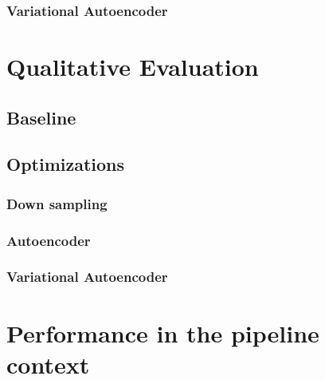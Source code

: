 \subsubsection{Variational Autoencoder}
\section{Qualitative Evaluation}\label{qualitative_eval}
\subsection{Baseline}
\subsection{Optimizations}
\subsubsection{Down sampling}
\subsubsection{Autoencoder}
\subsubsection{Variational Autoencoder}

\section{Performance in the pipeline context}
